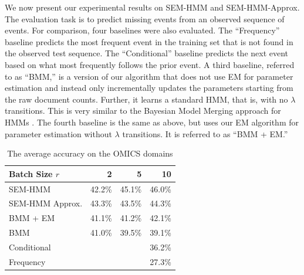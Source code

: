 \documentclass[letterpaper]{article}
\begin{document}
We now present our experimental results on SEM-HMM and SEM-HMM-Approx. The
evaluation task is to predict missing events from an observed sequence of events.  
For comparison, four baselines were also evaluated.  The ``Frequency'' baseline predicts the most frequent event in the training set that is not found in the observed test sequence. The ``Conditional'' baseline predicts the next event based on what most frequently follows the prior event.  %
A third baseline, referred to as ``BMM,'' is a version of our algorithm that does not use EM for parameter estimation and instead only incrementally updates the parameters starting from the raw document counts. Further, it learns a standard HMM, that is, with no $\lambda$ transitions. 
This is very similar to the Bayesian Model Merging approach for HMMs \cite{stolcke1994best}. 
The fourth baseline is the same as above, but uses our EM algorithm for parameter estimation without $\lambda$ transitions. It is referred to as ``BMM + EM.'' 

\begin{table}
\footnotesize
\begin{center}
\begin{tabular}{|l|r|r|r|}
\hline
Batch Size $r$ & 2 & 5 & 10\\
\hline
SEM-HMM & 42.2\% & 45.1\% & 46.0\%\\
SEM-HMM Approx.& 43.3\% & 43.5\% & 44.3\%\\
BMM + EM & 41.1\% & 41.2\% & 42.1\%\\
BMM & 41.0\% & 39.5\% & 39.1\%\\
\hline
Conditional & \multicolumn{3}{r|}{36.2\%}\\
Frequency & \multicolumn{3}{r|}{27.3\%}\\
\hline
\end{tabular}
\caption{The average accuracy on the OMICS domains}
\end{center}
\label{table:omics}
\end{table}
\end{document}
